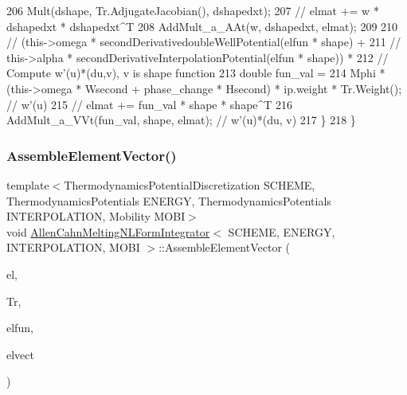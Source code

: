 \begin{DoxyCode}
206     Mult(dshape, Tr.AdjugateJacobian(), dshapedxt);
207     \textcolor{comment}{// elmat += w * dshapedxt * dshapedxt^T}
208     AddMult\_a\_AAt(w, dshapedxt, elmat);
209 
210     \textcolor{comment}{//  (this->omega * secondDerivativedoubleWellPotential(elfun * shape) +}
211     \textcolor{comment}{//   this->alpha * secondDerivativeInterpolationPotential(elfun * shape)) *}
212     \textcolor{comment}{// Compute w'(u)*(du,v), v is shape function}
213     \textcolor{keywordtype}{double} fun\_val =
214         Mphi * (this->omega * Wsecond + phase\_change * Hsecond) * ip.weight * Tr.Weight();  \textcolor{comment}{// w'(u)}
215     \textcolor{comment}{// elmat += fun\_val * shape * shape^T}
216     AddMult\_a\_VVt(fun\_val, shape, elmat);  \textcolor{comment}{// w'(u)*(du, v)}
217   \}
218 \}
\end{DoxyCode}
\mbox{\label{classAllenCahnMeltingNLFormIntegrator_ab8e7696b5052bda3c43f95f67f0b798f}} 
\subsubsection{\texorpdfstring{Assemble\+Element\+Vector()}{AssembleElementVector()}}
{\footnotesize\ttfamily template$<$Thermodynamics\+Potential\+Discretization S\+C\+H\+E\+ME, Thermodynamics\+Potentials E\+N\+E\+R\+GY, Thermodynamics\+Potentials I\+N\+T\+E\+R\+P\+O\+L\+A\+T\+I\+ON, Mobility M\+O\+BI$>$ \\
void \hyperlink{classAllenCahnMeltingNLFormIntegrator}{Allen\+Cahn\+Melting\+N\+L\+Form\+Integrator}$<$ S\+C\+H\+E\+ME, E\+N\+E\+R\+GY, I\+N\+T\+E\+R\+P\+O\+L\+A\+T\+I\+ON, M\+O\+BI $>$\+::Assemble\+Element\+Vector (\begin{DoxyParamCaption}\item[{const mfem\+::\+Finite\+Element \&}]{el,  }\item[{mfem\+::\+Element\+Transformation \&}]{Tr,  }\item[{const mfem\+::\+Vector \&}]{elfun,  }\item[{mfem\+::\+Vector \&}]{elvect }\end{DoxyParamCaption})\hspace{0.3cm}{\ttfamily [virtual]}}



